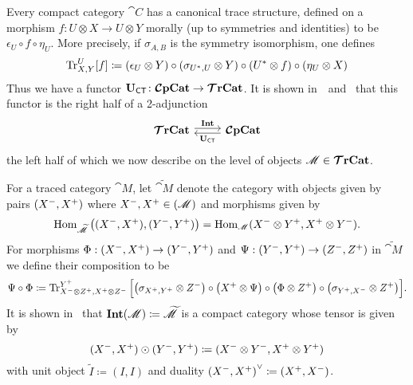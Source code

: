 \documentclass[11pt,oneside,article]{memoir}
\begin{document}
Every compact category $\cat{C}$ has a canonical trace structure, defined on a morphism $f\colon
U\otimes X\to U\otimes Y$ morally (up to symmetries and identities) to be $\epsilon_U\circ f\circ \eta_U$. More precisely, if
$\sigma_{A,B}$ is the symmetry isomorphism, one defines
\begin{equation*}
   \operatorname{Tr}^U_{X,Y}[f]\coloneqq(\epsilon_U\otimes Y)\circ (\sigma_{U^*,U}\otimes Y)\circ (U^*\otimes f)\circ (\eta_U\otimes X)
\end{equation*}
Thus we have a functor $\mathbf{U}_{\mathsf{CT}}\colon\bm{\mathcal{C}}\mathbf{pCat}\to\bm{\mathcal{T}}\mathbf{rCat}$. It is shown in~\cite{JoyalStreetVerity}~and~\cite{HK} that
this functor is the right half of a 2-adjunction
\begin{equation}\label{dia:traced_compact_adjunction}
\begin{tikzcd}
   \TTrCat\arrow[r,shift left=.5ex, "\Int"]&\CCompCat\arrow[l,shift left=.5ex,"\UCT"]
\end{tikzcd}
\end{equation}
the left half of which we now describe on the level of objects $\mathscr{M}\in\bm{\mathcal{T}}\mathbf{rCat}$.

For a traced category $\cat{M}$, let $\widetilde{\cat{M}}$ denote the category with
objects given by pairs $(X^-,X^+)$ where $X^-,X^+\in(\mathscr{M})$ and morphisms
given by
\[
   \operatorname{Hom}_{\widetilde{\mathscr{M}}}\big((X^-,X^+),(Y^-,Y^+)\big)=\operatorname{Hom}_{\mathscr{M}}(X^-\otimes Y^+,X^+\otimes Y^-).
\]
For morphisms $\Phi:(X^-,X^+)\to(Y^-,Y^+)$ and $\Psi:(Y^-,Y^+)\to(Z^-,Z^+)$ in $\widetilde{\cat{M}}$ we define their composition to be
\[
   \Psi\circ\Phi\coloneqq\operatorname{Tr}^{Y^+}_{X^-\otimes Z^+,X^+\otimes Z^-}\Big[\big(\sigma_{X^+,Y^+}\otimes Z^-\big)\circ\big(X^+\otimes\Psi\big)\circ\big(\Phi\otimes Z^+\big)\circ\big(\sigma_{Y^+,X^-}\otimes Z^+\big)\Big].
\]
It is shown in~\cite{JoyalStreetVerity} that $\mathbf{Int}(\mathscr{M})\coloneqq\widetilde{\mathscr{M}}$ is a compact category whose tensor is given by
\[
   (X^-,X^+)\odot(Y^-,Y^+)\coloneqq(X^-\otimes Y^-,X^+\otimes Y^+)
\]
with unit object $\tilde I\coloneqq(I,I)$ and duality ${(X^-,X^+)}^\vee\coloneqq(X^+,X^-)$.
\end{document}

